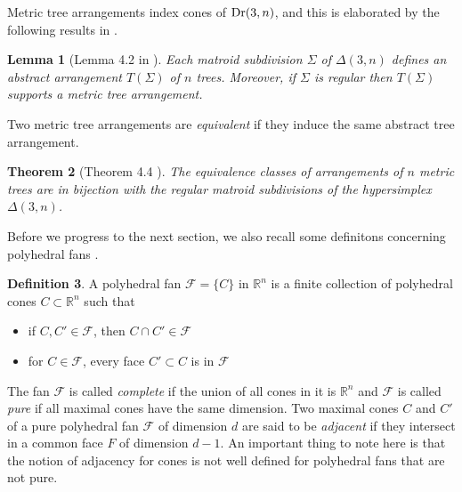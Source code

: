\documentclass[12pt]{article}
\DeclareMathOperator{\Dr}{\rm Dr}
\theoremstyle{plain}
\newtheorem{theorem}{Theorem}
\newtheorem{lemma}[theorem]{Lemma}
\theoremstyle{definition}
\newtheorem{definition}[theorem]{Definition}
\numberwithin{subcase}{case}
\begin{document}
Metric tree arrangements index cones of $\Dr(3,n)$, and this is elaborated by the following results in \cite{herrmann2009draw}.

\begin{lemma}[Lemma 4.2 in \cite{herrmann2009draw}]
Each matroid subdivision $\Sigma$ of $\Delta(3, n)$ defines an abstract arrangement $T(\Sigma)$ of $n$ trees. Moreover, if $\Sigma$ is regular then $T(\Sigma)$ supports a metric tree arrangement.
\end{lemma}

Two metric tree arrangements are \emph{equivalent} if they induce the same abstract tree arrangement.

\begin{theorem}[Theorem 4.4 \cite{herrmann2009draw} ]
The equivalence classes of arrangements of $n$ metric trees are in bijection with the regular matroid subdivisions of the hypersimplex $\Delta(3,n)$. 
\end{theorem}
 

Before we progress to the next section, we also recall some definitons concerning polyhedral fans \cite{arkani2021positive}. 

\begin{definition}
A polyhedral fan $\mathcal{F} = \{C\}$ in $\mathbb{R}^{n}$ is a finite collection of polyhedral cones $C \subset \mathbb{R}^{n}$ such that
\begin{itemize}
    \item if $C, C' \in \mathcal{F}$, then $C \cap C' \in \mathcal{F}$
    \item for $C \in \mathcal{F}$, every face $C'\subset C$ is in $\mathcal{F}$
\end{itemize}
\end{definition}

The fan $\mathcal{F}$ is called \emph{complete} if the union of all cones in it is $\mathbb{R}^{n}$ and $\mathcal{F}$ is called \emph{pure} if all maximal cones have the same dimension. Two maximal cones $C$ and $C'$ of a pure polyhedral fan $\mathcal{F}$ of dimension $d$ are said to be \emph{adjacent} if they intersect in a common face $F$ of dimension $d-1$. An important thing to note here is that the notion of adjacency for cones is not well defined for polyhedral fans that are not pure.
\end{document}
